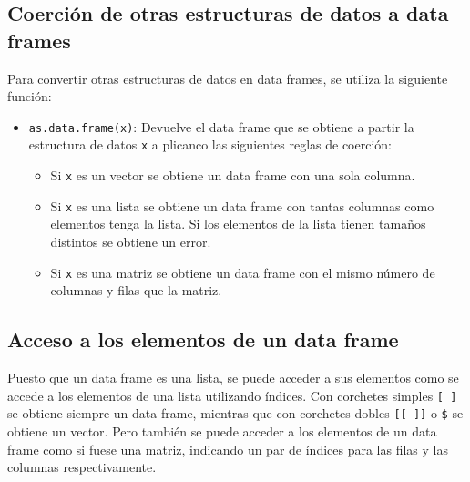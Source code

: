 \documentclass[
  spanish,
  a4paper,
]{scrreport}
\providecommand{\tightlist}{%
  \setlength{\itemsep}{0pt}\setlength{\parskip}{0pt}}
\theoremstyle{definition}
\theoremstyle{definition}
\theoremstyle{remark}
\begin{document}
\subsection{Coerción de otras estructuras de datos a data
frames}\label{coerciuxf3n-de-otras-estructuras-de-datos-a-data-frames}

Para convertir otras estructuras de datos en data frames, se utiliza la
siguiente función:

\begin{itemize}
\tightlist
\item
  \texttt{as.data.frame(x)}: Devuelve el data frame que se obtiene a
  partir la estructura de datos \texttt{x} a plicanco las siguientes
  reglas de coerción:

  \begin{itemize}
  \tightlist
  \item
    Si \texttt{x} es un vector se obtiene un data frame con una sola
    columna.
  \item
    Si \texttt{x} es una lista se obtiene un data frame con tantas
    columnas como elementos tenga la lista. Si los elementos de la lista
    tienen tamaños distintos se obtiene un error.
  \item
    Si \texttt{x} es una matriz se obtiene un data frame con el mismo
    número de columnas y filas que la matriz.
  \end{itemize}
\end{itemize}

\subsection{Acceso a los elementos de un data
frame}\label{acceso-a-los-elementos-de-un-data-frame}

Puesto que un data frame es una lista, se puede acceder a sus elementos
como se accede a los elementos de una lista utilizando índices. Con
corchetes simples \texttt{{[}\ {]}} se obtiene siempre un data frame,
mientras que con corchetes dobles \texttt{{[}{[}\ {]}{]}} o \texttt{\$}
se obtiene un vector. Pero también se puede acceder a los elementos de
un data frame como si fuese una matriz, indicando un par de índices para
las filas y las columnas respectivamente.
\end{document}
